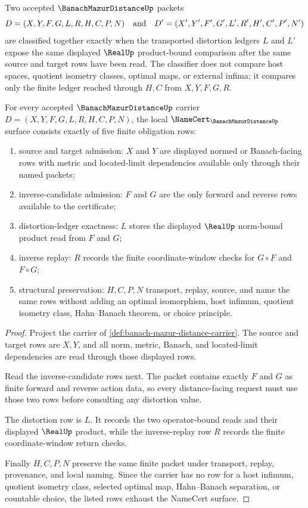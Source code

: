 \begin{definition}
\label{def:banach-mazur-distance-classifier}
Two accepted $\BanachMazurDistanceUp$ packets
$$
D=(X,Y,F,G,L,R,H,C,P,N)
\quad\hbox{and}\quad
D'=(X',Y',F',G',L',R',H',C',P',N')
$$
are classified together exactly when the transported distortion ledgers $L$ and $L'$ expose the same displayed $\RealUp$ product-bound comparison after the same source and target rows have been read. The classifier does not compare host spaces, quotient isometry classes, optimal maps, or external infima; it compares only the finite ledger reached through $H,C$ from $X,Y,F,G,R$.
\end{definition}

\begin{theorem}
\label{thm:banach-mazur-distance-namecert-obligations}
For every accepted $\BanachMazurDistanceUp$ carrier $D=(X,Y,F,G,L,R,H,C,P,N)$, the local $\NameCert_{\BanachMazurDistanceUp}$ surface consists exactly of five finite obligation rows:
\begin{enumerate}
\item source and target admission: $X$ and $Y$ are displayed normed or Banach-facing rows with metric and located-limit dependencies available only through their named packets;
\item inverse-candidate admission: $F$ and $G$ are the only forward and reverse rows available to the certificate;
\item distortion-ledger exactness: $L$ stores the displayed $\RealUp$ norm-bound product read from $F$ and $G$;
\item inverse replay: $R$ records the finite coordinate-window checks for $G \circ F$ and $F \circ G$;
\item structural preservation: $H,C,P,N$ transport, replay, source, and name the same rows without adding an optimal isomorphism, host infimum, quotient isometry class, Hahn--Banach theorem, or choice principle.
\end{enumerate}
\end{theorem}
\begin{proof}
Project the carrier of \autoref{def:banach-mazur-distance-carrier}. The source and target rows are $X,Y$, and all norm, metric, Banach, and located-limit dependencies are read through those displayed rows.

Read the inverse-candidate rows next. The packet contains exactly $F$ and $G$ as finite forward and reverse action data, so every distance-facing request must use those two rows before consulting any distortion value.

The distortion row is $L$. It records the two operator-bound reads and their displayed $\RealUp$ product, while the inverse-replay row $R$ records the finite coordinate-window return checks.

Finally $H,C,P,N$ preserve the same finite packet under transport, replay, provenance, and local naming. Since the carrier has no row for a host infimum, quotient isometry class, selected optimal map, Hahn--Banach separation, or countable choice, the listed rows exhaust the NameCert surface.
\end{proof}

